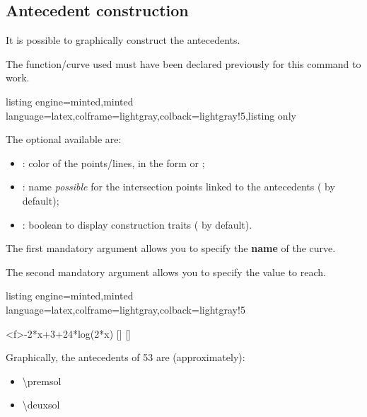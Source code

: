 \documentclass[11pt,a4paper]{ltxdoc}
\begin{document}
\pagebreak

\subsection{Antecedent construction}\label{tracanteced}

It is possible to graphically construct the antecedents.

The function/curve used must have been declared previously for this command to work.

\begin{tcblisting}{listing engine=minted,minted language=latex,colframe=lightgray,colback=lightgray!5,listing only}
\end{tcblisting}

The optional \MontreCode{[keys]} available are:

\smallskip

\begin{itemize}
	\item {}: color of the points/lines, in the form  or ;
	\item {}: name \textit{possible} for the intersection points linked to the antecedents ( by default);
	\item {}: boolean to display construction traits ( by default).
\end{itemize}

\smallskip

The first mandatory argument allows you to specify the \textbf{name} of the curve.

\smallskip

The second mandatory argument allows you to specify the value to reach.

\begin{tcblisting}{listing engine=minted,minted language=latex,colframe=lightgray,colback=lightgray!5}
\begin{GraphTikz}%
	[x=0.9cm,y=0.425cm,Xmin=4,Xmax=20,Origx=4,
	Ymin=40,Ymax=56,Ygrid=2,Ygrids=1,Origy=40]
	{-2*x+3+24*log(2*x)}
	[\premsol]
	[\deuxsol]
\end{GraphTikz}

Graphically, the antecedents of 53 are (approximately):

\begin{itemize}
	\item \num{\premsol}
	\item \num{\deuxsol}
\end{itemize}
\end{tcblisting}
\end{document}
